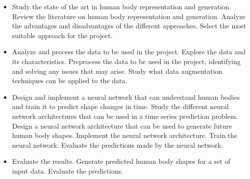 \begin{itemize}
	\item {} Study the state of the art in human body representation and
	      generation. \subitem Review the literature on human body representation and
	      generation. \subitem Analyze the advantages and disadvantages of the different
	      approaches. \subitem Select the most suitable approach for the project.
	\item {} Analyze and process the data to be used in the project. \subitem
	      Explore the data and its characteristics. \subitem Preprocess the data to be
	      used in the project, identifying and solving any issues that may arise.
	      \subitem Study what data augmentation techniques can be applied to the data.
	\item {} Design and implement a neural network that can understand human
	      bodies and train it to predict shape changes in time. \subitem Study the
	      different neural network architectures that can be used in a time series
	      prediction problem. \subitem Design a neural network architecture that can be
	      used to generate future human body shapes. \subitem Implement the neural
	      network architecture. \subitem Train the neural network. \subitem Evaluate the
	      predictions made by the neural network.
	\item {} Evaluate the results. \subitem Generate predicted human body
	      shapes for a set of input data. \subitem Evaluate the predictions.
\end{itemize}

